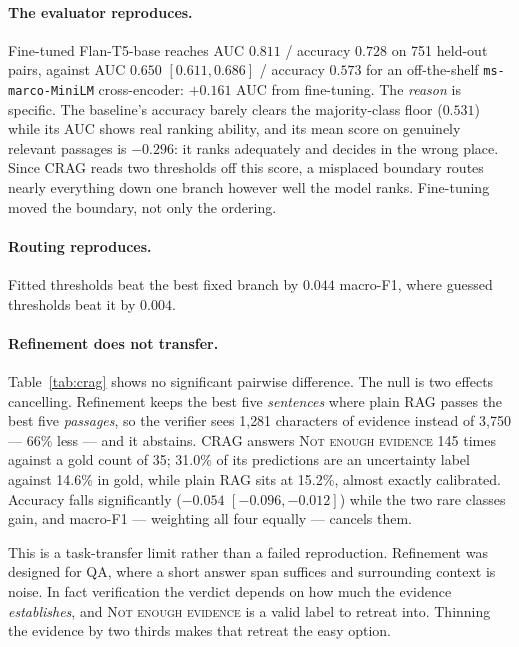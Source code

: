\documentclass[11pt]{article}
\begin{document}
\paragraph{The evaluator reproduces.} Fine-tuned Flan-T5-base reaches AUC
$0.811$ / accuracy $0.728$ on 751 held-out pairs, against AUC
$0.650$ $[0.611, 0.686]$ / accuracy $0.573$ for an off-the-shelf
\texttt{ms-marco-MiniLM} cross-encoder: $+0.161$ AUC from fine-tuning. The
\emph{reason} is specific. The baseline's accuracy barely clears the
majority-class floor ($0.531$) while its AUC shows real ranking ability, and its
mean score on genuinely relevant passages is $-0.296$: it ranks adequately and
decides in the wrong place. Since CRAG reads two thresholds off this score, a
misplaced boundary routes nearly everything down one branch however well the
model ranks. Fine-tuning moved the boundary, not only the ordering.

\paragraph{Routing reproduces.} Fitted thresholds beat the best fixed branch by
$0.044$ macro-F1, where guessed thresholds beat it by $0.004$.

\paragraph{Refinement does not transfer.} Table~\ref{tab:crag} shows no
significant pairwise difference. The null is two effects cancelling. Refinement
keeps the best five \emph{sentences} where plain RAG passes the best five
\emph{passages}, so the verifier sees 1{,}281 characters of evidence instead of
3{,}750 --- 66\% less --- and it abstains. CRAG answers \textsc{Not enough
evidence} 145 times against a gold count of 35; 31.0\% of its predictions are an
uncertainty label against 14.6\% in gold, while plain RAG sits at 15.2\%,
almost exactly calibrated. Accuracy falls significantly ($-0.054$
$[-0.096, -0.012]$) while the two rare classes gain, and macro-F1 --- weighting
all four equally --- cancels them.

This is a task-transfer limit rather than a failed reproduction. Refinement was
designed for QA, where a short answer span suffices and surrounding context is
noise. In fact verification the verdict depends on how much the evidence
\emph{establishes}, and \textsc{Not enough evidence} is a valid label to retreat
into. Thinning the evidence by two thirds makes that retreat the easy option.
\end{document}
